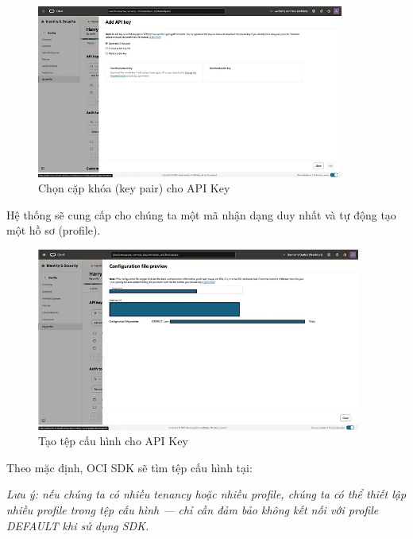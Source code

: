\begin{figure}[H] %
    \centering
    \includegraphics[width=0.9\textwidth, keepaspectratio]{Demo/Chon_cap_khoa.jpg}
    \caption{Chọn cặp khóa (key pair) cho API Key}
    \label{fig:cloud_intro}
\end{figure}

Hệ thống sẽ cung cấp cho chúng ta một mã nhận dạng duy nhất và tự động tạo một hồ sơ (profile).

\begin{figure}[H] %
    \centering
    \includegraphics[width=0.95\textwidth, keepaspectratio]{Demo/Cau_hinh.jpg}
    \caption{Tạo tệp cấu hình cho API Key}
    \label{fig:cloud_intro}
\end{figure}

Theo mặc định, OCI SDK sẽ tìm tệp cấu hình tại:

\begin{center}
\end{center}

\textit{Lưu ý: nếu chúng ta có nhiều tenancy hoặc nhiều profile, chúng ta có thể thiết lập nhiều profile trong tệp cấu hình — chỉ cần đảm bảo không kết nối với profile DEFAULT khi sử dụng SDK.}

